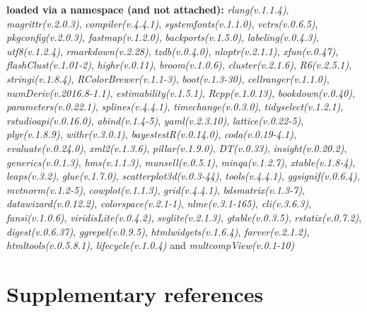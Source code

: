 \documentclass[
  bookmarksnumbered]{article}
\begin{document}
\textbf{loaded via a namespace (and not attached):}
\emph{rlang(v.1.1.4)}, \emph{magrittr(v.2.0.3)}, \emph{compiler(v.4.4.1)}, \emph{systemfonts(v.1.1.0)}, \emph{vctrs(v.0.6.5)}, \emph{pkgconfig(v.2.0.3)}, \emph{fastmap(v.1.2.0)}, \emph{backports(v.1.5.0)}, \emph{labeling(v.0.4.3)}, \emph{utf8(v.1.2.4)}, \emph{rmarkdown(v.2.28)}, \emph{tzdb(v.0.4.0)}, \emph{nloptr(v.2.1.1)}, \emph{xfun(v.0.47)}, \emph{flashClust(v.1.01-2)}, \emph{highr(v.0.11)}, \emph{broom(v.1.0.6)}, \emph{cluster(v.2.1.6)}, \emph{R6(v.2.5.1)}, \emph{stringi(v.1.8.4)}, \emph{RColorBrewer(v.1.1-3)}, \emph{boot(v.1.3-30)}, \emph{cellranger(v.1.1.0)}, \emph{numDeriv(v.2016.8-1.1)}, \emph{estimability(v.1.5.1)}, \emph{Rcpp(v.1.0.13)}, \emph{bookdown(v.0.40)}, \emph{parameters(v.0.22.1)}, \emph{splines(v.4.4.1)}, \emph{timechange(v.0.3.0)}, \emph{tidyselect(v.1.2.1)}, \emph{rstudioapi(v.0.16.0)}, \emph{abind(v.1.4-5)}, \emph{yaml(v.2.3.10)}, \emph{lattice(v.0.22-5)}, \emph{plyr(v.1.8.9)}, \emph{withr(v.3.0.1)}, \emph{bayestestR(v.0.14.0)}, \emph{coda(v.0.19-4.1)}, \emph{evaluate(v.0.24.0)}, \emph{xml2(v.1.3.6)}, \emph{pillar(v.1.9.0)}, \emph{DT(v.0.33)}, \emph{insight(v.0.20.2)}, \emph{generics(v.0.1.3)}, \emph{hms(v.1.1.3)}, \emph{munsell(v.0.5.1)}, \emph{minqa(v.1.2.7)}, \emph{xtable(v.1.8-4)}, \emph{leaps(v.3.2)}, \emph{glue(v.1.7.0)}, \emph{scatterplot3d(v.0.3-44)}, \emph{tools(v.4.4.1)}, \emph{ggsignif(v.0.6.4)}, \emph{mvtnorm(v.1.2-5)}, \emph{cowplot(v.1.1.3)}, \emph{grid(v.4.4.1)}, \emph{bdsmatrix(v.1.3-7)}, \emph{datawizard(v.0.12.2)}, \emph{colorspace(v.2.1-1)}, \emph{nlme(v.3.1-165)}, \emph{cli(v.3.6.3)}, \emph{fansi(v.1.0.6)}, \emph{viridisLite(v.0.4.2)}, \emph{svglite(v.2.1.3)}, \emph{gtable(v.0.3.5)}, \emph{rstatix(v.0.7.2)}, \emph{digest(v.0.6.37)}, \emph{ggrepel(v.0.9.5)}, \emph{htmlwidgets(v.1.6.4)}, \emph{farver(v.2.1.2)}, \emph{htmltools(v.0.5.8.1)}, \emph{lifecycle(v.1.0.4)} and \emph{multcompView(v.0.1-10)}

\section{Supplementary references}\label{refs}

\begin{multicols}{2}
\AtNextBibliography{\footnotesize}
\printbibliography[heading=none]
\normalsize
\end{multicols}

\def\printbibliography{}

\printbibliography
\end{document}
